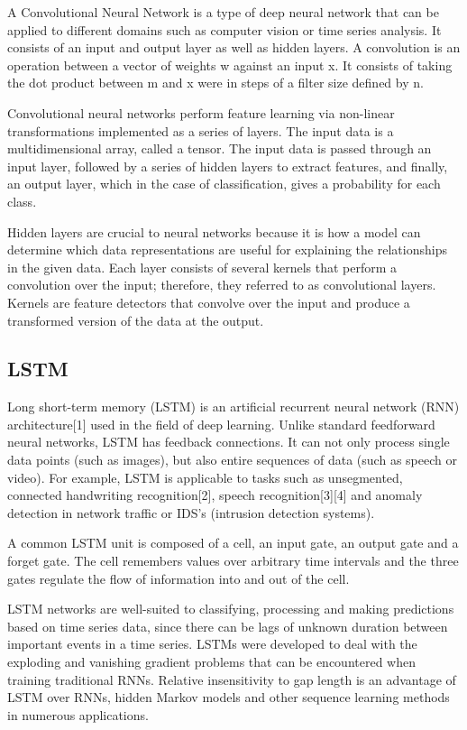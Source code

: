 \documentclass{turabian-thesis}
\newcounter{case}[section]
\begin{document}
A Convolutional Neural Network is a type of deep neural network that can be applied to different domains such as computer vision or time series analysis. It consists of an input and output layer as well as hidden layers. A convolution is an operation between a vector of weights w against an input x. It consists of taking the dot product between m and x were in steps of a filter size defined by n.

Convolutional neural networks perform feature learning via non-linear transformations implemented as a series of layers. The input data is a multidimensional array, called a tensor. The input data is passed through an input layer, followed by a series of hidden layers to extract features, and finally, an output layer, which in the case of classification, gives a probability for each class. 


Hidden layers are crucial to neural networks because it is how a model can determine which data representations are useful for explaining the relationships in the given data. Each layer consists of several kernels that perform a convolution over the input; therefore, they referred to as convolutional layers. Kernels are feature detectors that convolve over the input and produce a transformed version of the data at the output. 

\subsection{LSTM}

Long short-term memory (LSTM) is an artificial recurrent neural network (RNN) architecture[1] used in the field of deep learning. Unlike standard feedforward neural networks, LSTM has feedback connections. It can not only process single data points (such as images), but also entire sequences of data (such as speech or video). For example, LSTM is applicable to tasks such as unsegmented, connected handwriting recognition[2], speech recognition[3][4] and anomaly detection in network traffic or IDS's (intrusion detection systems).

A common LSTM unit is composed of a cell, an input gate, an output gate and a forget gate. The cell remembers values over arbitrary time intervals and the three gates regulate the flow of information into and out of the cell.


LSTM networks are well-suited to classifying, processing and making predictions based on time series data, since there can be lags of unknown duration between important events in a time series. LSTMs were developed to deal with the exploding and vanishing gradient problems that can be encountered when training traditional RNNs. Relative insensitivity to gap length is an advantage of LSTM over RNNs, hidden Markov models and other sequence learning methods in numerous applications.
\end{document}
